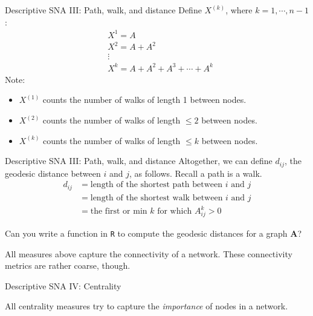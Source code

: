 \documentclass[10pt]{beamer}
\begin{document}
\begin{frame}{Descriptive SNA III: Path, walk, and distance}
Define $X^{(k)}$, where $k = 1, \cdots, n-1$:
	\begin{equation}
	\begin{split}
	& X^{1} = A \\
	& X^{2} = A + A^{2} \\
	& \vdots \\
	& X^{k} = A + A^{2} + A^{3} + \cdots + A^{k}
	\end{split}
	\end{equation}
Note:
	\begin{itemize}
		\item $X^{(1)}$ counts the number of walks of length 1 between nodes.
		\item $X^{(2)}$ counts the number of walks of length $\leq 2$ between nodes.
		\item $X^{(k)}$ counts the number of walks of length $\leq k$ between nodes.
	\end{itemize}
\end{frame}

\begin{frame}{Descriptive SNA III: Path, walk, and distance}
Altogether, we can define $d_{ij}$, the geodesic distance between $i$ and $j$, as follows. Recall a path is a walk.
	\begin{equation}
	\begin{split}
	d_{ij} & = \text{length of the shortest path between $i$ and $j$} \\
	& = \text{length of the shortest walk between $i$ and $j$} \\
	& = \text{the first or min $k$ for which $A_{ij}^{k}>0$}
	\end{split}
	\end{equation}
\end{frame}

\begin{frame}
Can you write a function in \texttt{R} to compute the geodesic distances for a graph \textbf{A}?
\end{frame}

\begin{frame}

All measures above capture the connectivity of a network.  These connectivity metrics are rather coarse, though.
\end{frame}

\begin{frame}{Descriptive SNA IV: Centrality}

All centrality measures try to capture the \textit{importance} of nodes in a network.
\end{frame}
\end{document}
